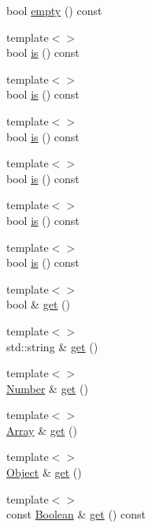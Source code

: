 \begin{DoxyCompactItemize}
\item 
bool \hyperlink{classjsonxx_1_1_value_af57bb610dd6dc3bfa943623e8694ecd1}{empty} () const 
\item 
{\footnotesize template$<$$>$ }\\bool \hyperlink{classjsonxx_1_1_value_a164b1a3988e31796320858f58d9ebd5d}{is} () const 
\item 
{\footnotesize template$<$$>$ }\\bool \hyperlink{classjsonxx_1_1_value_a164b1a3988e31796320858f58d9ebd5d}{is} () const 
\item 
{\footnotesize template$<$$>$ }\\bool \hyperlink{classjsonxx_1_1_value_a164b1a3988e31796320858f58d9ebd5d}{is} () const 
\item 
{\footnotesize template$<$$>$ }\\bool \hyperlink{classjsonxx_1_1_value_a164b1a3988e31796320858f58d9ebd5d}{is} () const 
\item 
{\footnotesize template$<$$>$ }\\bool \hyperlink{classjsonxx_1_1_value_a164b1a3988e31796320858f58d9ebd5d}{is} () const 
\item 
{\footnotesize template$<$$>$ }\\bool \hyperlink{classjsonxx_1_1_value_a164b1a3988e31796320858f58d9ebd5d}{is} () const 
\item 
{\footnotesize template$<$$>$ }\\bool \& \hyperlink{classjsonxx_1_1_value_aaf0fb70e2062bdff3eeb3205b74512e3}{get} ()
\item 
{\footnotesize template$<$$>$ }\\std\+::string \& \hyperlink{classjsonxx_1_1_value_a765462c916ed83cc8aa5c983fce9679d}{get} ()
\item 
{\footnotesize template$<$$>$ }\\\hyperlink{namespacejsonxx_a189d79e326066a8e082664e4062f3fc8}{Number} \& \hyperlink{classjsonxx_1_1_value_aaf95ad95694f1511ead177a54e1b1af4}{get} ()
\item 
{\footnotesize template$<$$>$ }\\\hyperlink{classjsonxx_1_1_array}{Array} \& \hyperlink{classjsonxx_1_1_value_a651619905bcd83e8b3b372894149f548}{get} ()
\item 
{\footnotesize template$<$$>$ }\\\hyperlink{classjsonxx_1_1_object}{Object} \& \hyperlink{classjsonxx_1_1_value_abd383243656bf4831d1a38c22e141759}{get} ()
\item 
{\footnotesize template$<$$>$ }\\const \hyperlink{namespacejsonxx_aa700abaa02dfd30f2a09ba8e95c6f3eb}{Boolean} \& \hyperlink{classjsonxx_1_1_value_a84110159fd993fd2818636a75718f9d1}{get} () const 

\end{DoxyCompactItemize}
